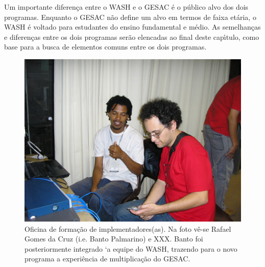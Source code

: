 \documentclass[
12pt,		%
openright,	%
twoside,  %
a4paper,			%
chapter=TITLE,		%
english,			%
french,				%
spanish,			%
brazil				%
]{USPSC-classe/USPSC}
\begin{document}
Um importante diferen\c{c}a entre o WASH e o GESAC \'e o p\'ublico alvo dos dois programas. Enquanto o GESAC n\~ao define um alvo em termos de faixa et\'aria, o WASH \'e voltado para estudantes do ensino fundamental e m\'edio. As semelhan\c{c}as e diferen\c{c}as entre os dois programas ser\~ao elencadas ao final deste cap\'{\i}tulo, como base para a busca de elementos comuns entre os dois programas.






\captionsetup{format=plain}
\begin{figure}[max size={\textwidth}{\textheight}]

\centering


\begin{minipage}[b]{0.4\linewidth}
        \centering
                \includegraphics[width=1.0\linewidth]{../../imagens/bantorafa.JPG}
                \caption{Oficina de forma\c{c}\~ao de implementadores(as). Na foto v\^e-se Rafael Gomes da Cruz (i.e. Banto Palmarino) e XXX. Banto foi posteriormente integrado `a equipe do WASH, trazendo para o novo programa a experi\^encia de multiplica\c{c}\~ao do GESAC.}
                \label{d2d74ac61c1b95a746858e8420d24348e1b48f51}
\end{minipage}%
\hspace{0.5cm}
\begin{minipage}[b]{0.4\linewidth}
        \centering

\end{minipage}
\end{figure}
\end{document}
